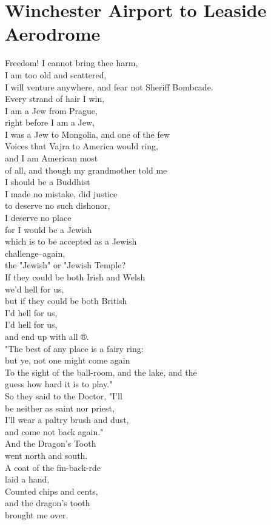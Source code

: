 \documentclass[smalldemyvopaper,11pt,twoside,onecolumn,openright,extrafontsizes]{memoir}
\begin{document}
\chapter{Winchester Airport to Leaside Aerodrome}
Freedom! I cannot bring thee harm,
\\I am too old and scattered,
\\I will venture anywhere, and fear not Sheriff Bombcade.
\\Every strand of hair I win,
\\I am a Jew from Prague,
\\right before I am a Jew,
\\I was a Jew to Mongolia, and one of the few
\\Voices that Vajra to America would ring,
\\and I am American most
\\of all, and though my grandmother told me
\\I should be a Buddhist
\\I made no mistake, did justice
\\to deserve no such dishonor,
\\I deserve no place
\\for I would be a Jewish
\\which is to be accepted as a Jewish
\\challenge--again,
\\the "Jewish" or "Jewish Temple?
\\If they could be both Irish and Welsh
\\we'd hell for us,
\\but if they could be both British
\\I'd hell for us,
\\I'd hell for us,
\\and end up with all ®.
\\"The best of any place is a fairy ring:
\\but ye, not one might come again
\\To the sight of the ball-room, and the lake, and the
\\guess how hard it is to play."
\\So they said to the Doctor, "I'll
\\be neither as saint nor priest,
\\I'll wear a paltry brush and dust,
\\and come not back again."
\\And the Dragon's Tooth
\\went north and south.
\\A coat of the fin-back-rde
\\laid a hand,
\\Counted chips and cents,
\\and the dragon's tooth
\\brought me over.
\end{document}
